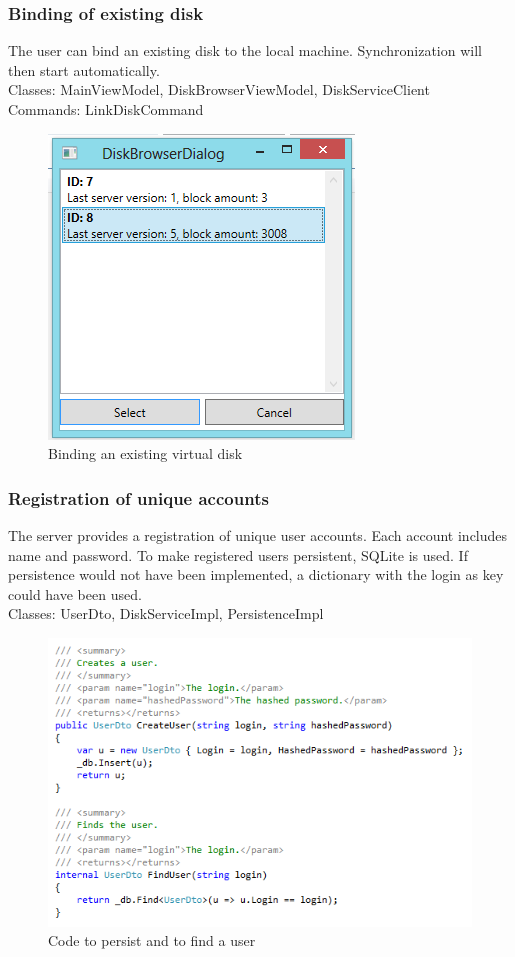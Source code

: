 \documentclass[JCDReport.tex]{subfiles}
\begin{document}
\subsubsection{Binding of existing disk}
The user can bind an existing disk to the local machine. Synchronization will then start automatically.\\
Classes: MainViewModel, DiskBrowserViewModel, DiskServiceClient\\
Commands: LinkDiskCommand
\begin{figure}[h!]
	\centering
	\includegraphics[scale=1]{Images/tutorial/13.png} 
	\caption{Binding an existing virtual disk}
\end{figure}	

\subsubsection{Registration of unique accounts}
The server provides a registration of unique user accounts. Each account includes name and password. To make registered users persistent, SQLite is used. If persistence would not have been implemented, a dictionary with the login as key could have been used.\\
Classes: UserDto, DiskServiceImpl, PersistenceImpl
\begin{figure}[h!]
	\centering
	\includegraphics[scale=1]{Images/login_server.png} 
	\caption{Code to persist and to find a user}
\end{figure}
\end{document}
